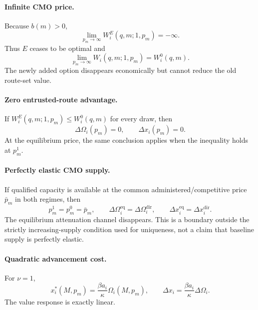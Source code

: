 \paragraph{Infinite CMO price.}
Because \(b(m)>0\),
\[
  \lim_{p_m\to\infty}W_i^E(q,m;1,p_m)=-\infty.
\]
Thus \(E\) ceases to be optimal and
\begin{equation}
  \lim_{p_m\to\infty}
  W_i(q,m;1,p_m)
  =
  W_i^0(q,m).
  \label{eq:p15-infinite-price-boundary}
\end{equation}
The newly added option disappears economically but cannot reduce the old
route-set value.

\paragraph{Zero entrusted-route advantage.}
If \(W_i^E(q,m;1,p_m)\leq W_i^0(q,m)\) for every draw, then
\begin{equation}
  \Delta\Omega_i(p_m)=0,
  \qquad
  \Delta x_i(p_m)=0.
  \label{eq:p15-zero-advantage-boundary}
\end{equation}
At the equilibrium price, the same conclusion applies when the inequality
holds at \(p_m^1\).

\paragraph{Perfectly elastic CMO supply.}
If qualified capacity is available at the common administered/competitive
price \(\bar p_m\) in both regimes, then
\[
  p_m^1=p_m^0=\bar p_m,
  \qquad
  \Delta\Omega_i^{\mathrm{eq}}=\Delta\Omega_i^{\mathrm{dir}},
  \qquad
  \Delta x_i^{\mathrm{eq}}=\Delta x_i^{\mathrm{dir}}.
\]
The equilibrium attenuation channel disappears. This is a boundary outside
the strictly increasing-supply condition used for uniqueness, not a claim
that baseline supply is perfectly elastic.

\paragraph{Quadratic advancement cost.}
For \(\nu=1\),
\begin{equation}
  x_i^*(M,p_m)
  =
  \frac{\beta a_i}{\kappa}\Omega_i(M,p_m),
  \qquad
  \Delta x_i
  =
  \frac{\beta a_i}{\kappa}\Delta\Omega_i.
  \label{eq:p15-quadratic-boundary}
\end{equation}
The value response is exactly linear.

